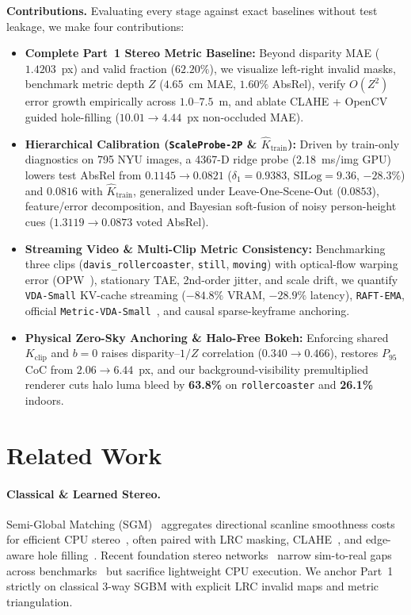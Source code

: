 \documentclass[10pt,twocolumn,letterpaper]{article}
\begin{document}
\textbf{Contributions.} Evaluating every stage against exact baselines without test leakage, we make four contributions:
\begin{itemize}
  \item \textbf{Complete Part~1 Stereo Metric Baseline:} Beyond disparity MAE ($1.4203$~px) and valid fraction ($62.20\%$), we visualize left-right invalid masks, benchmark metric depth $Z$ ($4.65$~cm MAE, $1.60\%$ AbsRel), verify $O(Z^2)$ error growth empirically across $1.0$--$7.5$~m, and ablate CLAHE + OpenCV guided hole-filling ($10.01\to 4.44$~px non-occluded MAE).
  \item \textbf{Hierarchical Calibration (\texttt{ScaleProbe-2P} \& $\hat{K}_{\mathrm{train}}$):} Driven by train-only diagnostics on 795 NYU images, a 4367-D ridge probe (2.18~ms/img GPU) lowers test AbsRel from $0.1145\to 0.0821$ ($\delta_1=0.9383$, $\mathrm{SILog}=9.36$, $-28.3\%$) and $0.0816$ with $\hat{K}_{\mathrm{train}}$, generalized under Leave-One-Scene-Out ($0.0853$), feature/error decomposition, and Bayesian soft-fusion of noisy person-height cues ($1.3119\to 0.0873$ voted AbsRel).
  \item \textbf{Streaming Video \& Multi-Clip Metric Consistency:} Benchmarking three clips (\texttt{davis\_rollercoaster}, \texttt{still}, \texttt{moving}) with optical-flow warping error (OPW~\cite{teed2020raft,wang2023nvds}), stationary TAE, 2nd-order jitter, and scale drift, we quantify \texttt{VDA-Small} KV-cache streaming ($-84.8\%$ VRAM, $-28.9\%$ latency), \texttt{RAFT-EMA}, official \texttt{Metric-VDA-Small}~\cite{chen2025vda}, and causal sparse-keyframe anchoring.
  \item \textbf{Physical Zero-Sky Anchoring \& Halo-Free Bokeh:} Enforcing shared $K_{\mathrm{clip}}$ and $b=0$ raises disparity--$1/Z$ correlation ($0.340\to 0.466$), restores $P_{95}$ CoC from $2.06\to 6.44$~px, and our background-visibility premultiplied renderer cuts halo luma bleed by \textbf{63.8\%} on \texttt{rollercoaster} and \textbf{26.1\%} indoors.
\end{itemize}

\section{Related Work}
\paragraph{Classical \& Learned Stereo.}
Semi-Global Matching (SGM)~\cite{hirschmuller2008sgm} aggregates directional scanline smoothness costs for efficient CPU stereo~\cite{scharstein2014middlebury}, often paired with LRC masking, CLAHE~\cite{zuiderveld1994clahe}, and edge-aware hole filling~\cite{he2013guided,min2014fast}. Recent foundation stereo networks~\cite{wen2025foundationstereo,jiang2025defomstereo,guan2025bridgedepth} narrow sim-to-real gaps across benchmarks~\cite{geiger2012kitti} but sacrifice lightweight CPU execution. We anchor Part~1 strictly on classical 3-way SGBM with explicit LRC invalid maps and metric triangulation.
\end{document}
